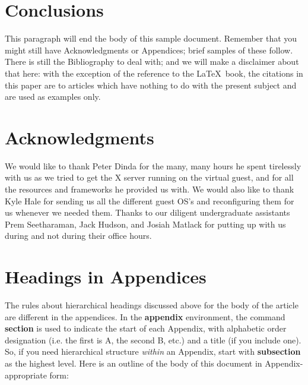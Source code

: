 \documentclass{acm_proc_article-sp}
\begin{document}
\section{Conclusions}
This paragraph will end the body of this sample document.
Remember that you might still have Acknowledgments or
Appendices; brief samples of these
follow.  There is still the Bibliography to deal with; and
we will make a disclaimer about that here: with the exception
of the reference to the \LaTeX\ book, the citations in
this paper are to articles which have nothing to
do with the present subject and are used as
examples only.

\section{Acknowledgments}
We would like to thank Peter Dinda for the many, many hours he spent tirelessly with us as we
tried to get the X server running on the virtual guest, and for all the
resources and frameworks he provided us with. We would also like to thank Kyle
Hale for sending us all the different guest OS's and reconfiguring them for us
whenever we needed them. Thanks to our diligent undergraduate assistants Prem
Seetharaman, Jack Hudson, and Josiah Matlack for putting up with us during and
not during their office hours.
%

%
%
\appendix
\section{Headings in Appendices}
The rules about hierarchical headings discussed above for
the body of the article are different in the appendices.
In the \textbf{appendix} environment, the command
\textbf{section} is used to
indicate the start of each Appendix, with alphabetic order
designation (i.e. the first is A, the second B, etc.) and
a title (if you include one).  So, if you need
hierarchical structure
\textit{within} an Appendix, start with \textbf{subsection} as the
highest level. Here is an outline of the body of this
document in Appendix-appropriate form:
\end{document}
